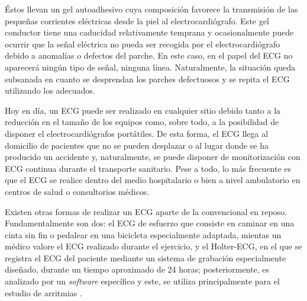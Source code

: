 \documentclass[12pt,letterpaper,oneside,openright]{book}
\begin{document}
Éstos llevan un gel autoadhesivo cuya composición favorece la transmisión de las pequeñas corrientes eléctricas desde la piel al electrocardiógrafo. Este gel conductor tiene una caducidad relativamente temprana y ocasionalmente puede ocurrir que la señal eléctrica no pueda ser recogida por el electrocardiógrafo debido a anomalías o defectos del parche. En este caso, en el papel del ECG no aparecerá ningún tipo de señal, ninguna línea. Naturalmente, la situación queda subsanada en cuanto se desprendan los parches defectuosos y se repita el ECG utilizando los adecuados. 

Hoy en día, un ECG puede ser realizado en cualquier sitio debido tanto a la reducción en el tamaño de los equipos como, sobre todo, a la posibilidad de disponer el electrocardiógrafos portátiles. De esta forma, el ECG llega al domicilio de pacientes que no se pueden desplazar o al lugar donde se ha producido un accidente y, naturalmente, se puede disponer de monitorización con ECG continua durante el transporte sanitario. Pese a todo, lo más frecuente es que el ECG se realice dentro del medio hospitalario o bien a nivel ambulatorio en centros de salud o consultorios médicos.

Existen otras formas de realizar un ECG aparte de la convencional en reposo. Fundamentalmente son dos: el ECG de esfuerzo que consiste en caminar en una cinta sin fin o pedalear en una bicicleta especialmente adaptada, mientas un médico valore el ECG realizado durante el ejercicio, y el Holter-ECG, en el que se registra el ECG del paciente mediante un sistema de grabación especialmente diseñado, durante un tiempo aproximado de 24 horas; posteriormente, es analizado por un \textit{software} específico y este, se utiliza principalmente para el estudio de arritmias \cite{textCardi}. 
\end{document}
